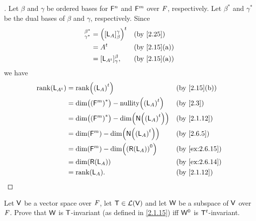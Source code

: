 \begin{proof}[]
  Let \(\beta\) and \(\gamma\) be ordered bases for \(\mathsf{F}^n\) and \(\mathsf{F}^m\) over \(\mathit{F}\), respectively.
  Let \(\beta^*\) and \(\gamma^*\) be the dual bases of \(\beta\) and \(\gamma\), respectively.
  Since
  \begin{align*}
    [\tp{\pa{\L_A}}]_{\gamma^*}^{\beta^*} & = \tp{\pa{[\L_A]_{\beta}^{\gamma}}} &  & \text{(by \cref{2.25})}    \\
                                          & = \tp{A}                            &  & \text{(by \cref{2.15}(a))} \\
                                          & = [\L_{\tp{A}}]_{\gamma}^{\beta},   &  & \text{(by \cref{2.15}(a))}
  \end{align*}
  we have
  \begin{align*}
    \rk{\L_{\tp{A}}} & = \rk{\tp{\pa{\L_A}}}                                     &  & \text{(by \cref{2.15}(b))}   \\
                     & = \dim\pa{\pa{\vs{F}^m}^*} - \nt{\tp{\pa{\L_A}}}          &  & \text{(by \cref{2.3})}       \\
                     & = \dim\pa{\pa{\vs{F}^m}^*} - \dim\pa{\ns{\tp{\pa{\L_A}}}} &  & \text{(by \cref{2.1.12})}    \\
                     & = \dim\pa{\vs{F}^m} - \dim\pa{\ns{\tp{\pa{\L_A}}}}        &  & \text{(by \cref{2.6.5})}     \\
                     & = \dim\pa{\vs{F}^m} - \dim\pa{\pa{\rg{\L_A}}^0}           &  & \text{(by \cref{ex:2.6.15})} \\
                     & = \dim\pa{\rg{\L_A}}                                      &  & \text{(by \cref{ex:2.6.14})} \\
                     & = \rk{\L_A}.                                              &  & \text{(by \cref{2.1.12})}
  \end{align*}
\end{proof}

\begin{ex}\label{ex:2.6.17}
  Let \(\mathsf{V}\) be a vector space over \(\mathit{F}\), let \(\mathsf{T} \in \mathcal{L}(\mathsf{V})\) and let \(\mathsf{W}\) be a subspace of \(\mathsf{V}\) over \(\mathit{F}\).
  Prove that \(\mathsf{W}\) is \(\mathsf{T}\)-invariant (as defined in \cref{2.1.15}) iff \(\mathsf{W}^0\) is \({\mathsf{T}}^{t}\)-invariant.
\end{ex}

